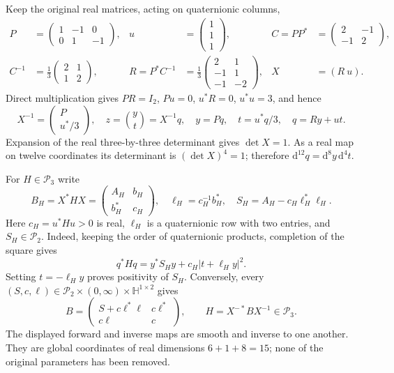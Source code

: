 \documentclass[11pt,a4paper]{article}
\numberwithin{equation}{section}
\theoremstyle{definition}
\theoremstyle{remark}
\newcommand{\HH}{\mathbb H}
\newcommand{\PP}{\mathcal P}
\newcommand{\invstar}{^{-\!*}}
\begin{document}
Keep the original real matrices, acting on quaternionic columns,
\begin{align}
P&=\begin{pmatrix}1&-1&0\\0&1&-1\end{pmatrix},&
u&=\begin{pmatrix}1\\1\\1\end{pmatrix},&
C=PP^*&=\begin{pmatrix}2&-1\\-1&2\end{pmatrix},\label{eq:PU}\\
C^{-1}&=\frac13\begin{pmatrix}2&1\\1&2\end{pmatrix},&
R=P^*C^{-1}&=\frac13\begin{pmatrix}2&1\\-1&1\\-1&-2\end{pmatrix},&
X&=(R\ u).\label{eq:RX}
\end{align}
Direct multiplication gives $PR=I_2$, $Pu=0$, $u^*R=0$, $u^*u=3$,
and hence
\begin{equation}\label{eq:coordinates}
X^{-1}=\begin{pmatrix}P\\u^*/3\end{pmatrix},\quad
z=\binom yt=X^{-1}q,\quad y=Pq,\quad t=u^*q/3,\quad q=Ry+ut.
\end{equation}
Expansion of the real three-by-three determinant gives $\det X=1$.
As a real map on twelve coordinates its determinant is $(\det X)^4=1$;
therefore $\mathrm d^{12}q=\mathrm d^8y\,\mathrm d^4t$.

For $H\in\PP_3$ write
\begin{equation}\label{eq:schur}
B_H=X^*HX=\begin{pmatrix}A_H&b_H\\b_H^*&c_H\end{pmatrix},\quad
\ell_H=c_H^{-1}b_H^*,\quad
S_H=A_H-c_H\ell_H^*\ell_H.
\end{equation}
Here $c_H=u^*Hu>0$ is real, $\ell_H$ is a quaternionic row with two
entries, and $S_H\in\PP_2$. Indeed, keeping the order of quaternionic
products, completion of the square gives
\begin{equation}\label{eq:square}
q^*Hq=y^*S_Hy+c_H|t+\ell_Hy|^2.
\end{equation}
Setting $t=-\ell_Hy$ proves positivity of $S_H$. Conversely, every
$(S,c,\ell)\in\PP_2\times(0,\infty)\times\HH^{1\times2}$ gives
\begin{equation}\label{eq:inverseparam}
B=\begin{pmatrix}S+c\ell^*\ell&c\ell^*\\c\ell&c\end{pmatrix},
\qquad H=X\invstar B X^{-1}\in\PP_3.
\end{equation}
The displayed forward and inverse maps are smooth and inverse to one another.
They are global coordinates of real dimensions $6+1+8=15$; none of
the original parameters has been removed.
\end{document}
